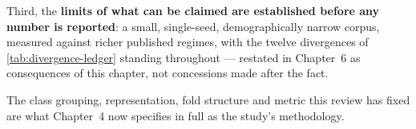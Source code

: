Third, the \textbf{limits of what can be claimed are established before any number is reported}: a small, single-seed, demographically narrow corpus, measured against richer published regimes, with the twelve divergences of \autoref{tab:divergence-ledger} standing throughout --- restated in Chapter~6 as consequences of this chapter, not concessions made after the fact.

The class grouping, representation, fold structure and metric this review has fixed are what Chapter~4 now specifies in full as the study's methodology.

